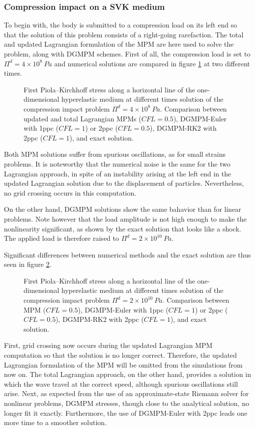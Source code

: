 \subsubsection{Compression impact on a SVK medium}
To begin with, the body is submitted to a compression load on its left end so that the solution of this problem consists of a right-going rarefaction. The total and updated Lagrangian formulation of the MPM are here used to solve the problem, along with DGMPM schemes. First of all, the compression load is set to $\Pi^d= 4\times 10^{8} \: Pa$ and numerical solutions are compared in figure \ref{fig:he_rarefaction_UL} at two different times.
\begin{figure}[h!]
  \centering
  {}
  \caption{First Piola–Kirchhoff stress along a horizontal line of the one-dimensional hyperelastic medium at different times solution of the compression impact problem $\Pi^d= 4\times 10^{8} \: Pa$. Comparison between updated and total Lagrangian MPMs ($CFL=0.5$), DGMPM-Euler with 1ppc ($CFL=1$) or 2ppc ($CFL=0.5$), DGMPM-RK2 with 2ppc ($CFL=1$), and exact solution.}
  \label{fig:he_rarefaction_UL}
\end{figure}
Both MPM solutions suffer from spurious oscillations, as for small strains problems. It is noteworthy that the numerical noise is the same for the two Lagrangian approach, in spite of an instability arising at the left end in the updated Lagrangian solution due to the displacement of particles. Nevertheless, no grid crossing occurs in this computation.

On the other hand, DGMPM solutions show the same bahavior than for linear problems. Note however that the load amplitude is not high enough to make the nonlinearity significant, as shown by the exact solution that looks like a shock. The applied load is therefore raised to $\Pi^d= 2\times 10^{10} \: Pa$.

Significant differences between numerical methods and the exact solution are thus seen in figure \ref{fig:he_rarefaction}.
\begin{figure}[h!]
  \centering
  {}
  \caption{First Piola–Kirchhoff stress along a horizontal line of the one-dimensional hyperelastic medium at different times solution of the compression impact problem $\Pi^d= 2\times 10^{10} \: Pa$. Comparison between MPM ($CFL=0.5$), DGMPM-Euler with 1ppc ($CFL=1$) or 2ppc ($CFL=0.5$), DGMPM-RK2 with 2ppc ($CFL=1$), and exact solution.}
  \label{fig:he_rarefaction}
\end{figure}
First, grid crossing now occurs during the updated Lagrangian MPM computation so that the solution is no longer correct. Therefore, the updated Lagrangian formulation of the MPM will be omitted from the simulations from now on.
The total Lagrangian approach, on the other hand, provides a solution in which the wave travel at the correct speed, although spurious oscillations still arise.
Next, as expected from the use of an approximate-state Riemann solver for nonlinear problems, DGMPM stresses, though close to the analytical solution, no longer fit it exactly.
Furthermore, the use of DGMPM-Euler with 2ppc leads one more time to a smoother solution.

